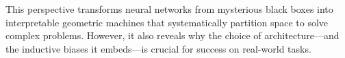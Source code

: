 \documentclass[11pt]{article}
\begin{document}
This perspective transforms neural networks from mysterious black boxes into interpretable geometric machines that systematically partition space to solve complex problems. However, it also reveals why the choice of architecture—and the inductive biases it embeds—is crucial for success on real-world tasks.
\end{document}
